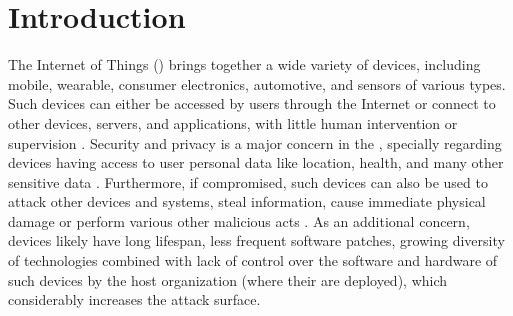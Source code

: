 

\section{Introduction}



The Internet of Things (\iot) brings together a wide variety of devices,
including mobile, wearable, consumer electronics, automotive, and sensors of
various types.
% 
Such devices can either be accessed by users through the Internet or connect
to other devices, servers, and applications,
with little human intervention or supervision
\cite{Tahsien2020,abane2019,haddadpajouh2019survey,Shanbhag2015}.
% 
Security and privacy is a major concern in the \iot, specially regarding
devices having access to user personal data like
location, health, and many other sensitive data \cite{sengupta2020comprehensive}.
% 
Furthermore, if compromised, such devices can also be used to attack other
devices and systems, steal information, cause immediate physical damage or
perform various other malicious acts \cite{Kolias2017mirai}.
% 
As an additional concern, \iot devices likely have long lifespan, less frequent
software patches, growing diversity of technologies combined with lack of
control over the software and hardware of such devices by the host organization
(where their are deployed), which considerably increases the attack surface.


